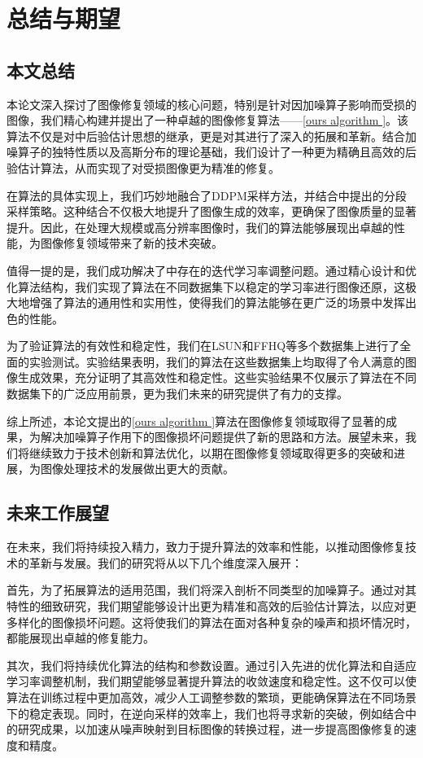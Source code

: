 \chapter{总结与期望}
\section{本文总结}
本论文深入探讨了图像修复领域的核心问题，特别是针对因加噪算子影响而受损的图像，我们精心构建并提出了一种卓越的图像修复算法——\ref{ours algorithm }。该算法不仅是对\cite{Inverse}中后验估计思想的继承，更是对其进行了深入的拓展和革新。结合加噪算子的独特性质以及高斯分布的理论基础，我们设计了一种更为精确且高效的后验估计算法，从而实现了对受损图像更为精准的修复。

在算法的具体实现上，我们巧妙地融合了DDPM采样方法，并结合\cite{DDIM}中提出的分段采样策略。这种结合不仅极大地提升了图像生成的效率，更确保了图像质量的显著提升。因此，在处理大规模或高分辨率图像时，我们的算法能够展现出卓越的性能，为图像修复领域带来了新的技术突破。

值得一提的是，我们成功解决了\cite{Inverse}中存在的迭代学习率调整问题。通过精心设计和优化算法结构，我们实现了算法在不同数据集下以稳定的学习率进行图像还原，这极大地增强了算法的通用性和实用性，使得我们的算法能够在更广泛的场景中发挥出色的性能。

为了验证算法的有效性和稳定性，我们在LSUN和FFHQ等多个数据集上进行了全面的实验测试。实验结果表明，我们的算法在这些数据集上均取得了令人满意的图像生成效果，充分证明了其高效性和稳定性。这些实验结果不仅展示了算法在不同数据集下的广泛应用前景，更为我们未来的研究提供了有力的支撑。

综上所述，本论文提出的\ref{ours algorithm }算法在图像修复领域取得了显著的成果，为解决加噪算子作用下的图像损坏问题提供了新的思路和方法。展望未来，我们将继续致力于技术创新和算法优化，以期在图像修复领域取得更多的突破和进展，为图像处理技术的发展做出更大的贡献。
\section{未来工作展望}
在未来，我们将持续投入精力，致力于提升算法的效率和性能，以推动图像修复技术的革新与发展。我们的研究将从以下几个维度深入展开：

首先，为了拓展算法的适用范围，我们将深入剖析不同类型的加噪算子。通过对其特性的细致研究，我们期望能够设计出更为精准和高效的后验估计算法，以应对更多样化的图像损坏问题。这将使我们的算法在面对各种复杂的噪声和损坏情况时，都能展现出卓越的修复能力。

其次，我们将持续优化算法的结构和参数设置。通过引入先进的优化算法和自适应学习率调整机制，我们期望能够显著提升算法的收敛速度和稳定性。这不仅可以使算法在训练过程中更加高效，减少人工调整参数的繁琐，更能确保算法在不同场景下的稳定表现。同时，在逆向采样的效率上，我们也将寻求新的突破，例如结合\cite{Consistency}中的研究成果，以加速从噪声映射到目标图像的转换过程，进一步提高图像修复的速度和精度。

